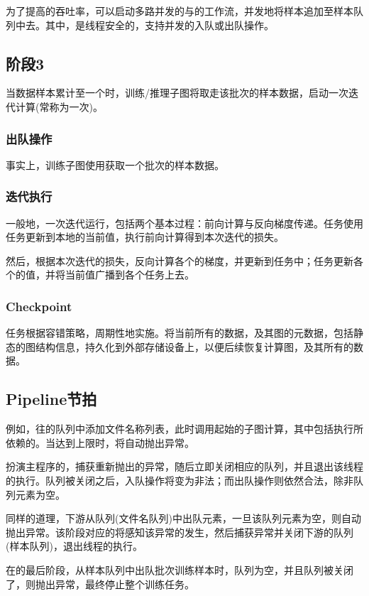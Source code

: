 \begin{content}
为了提高的吞吐率，可以启动多路并发的与的工作流，并发地将样本追加至样本队列中去。其中，是线程安全的，支持并发的入队或出队操作。

\subsection{阶段3}

当数据样本累计至一个时，训练/推理子图将取走该批次的样本数据，启动一次迭代计算(常称为一次)。

\subsubsection{出队操作}

事实上，训练子图使用获取一个批次的样本数据。

\subsubsection{迭代执行}

一般地，一次迭代运行，包括两个基本过程：前向计算与反向梯度传递。任务使用任务更新到本地的当前值，执行前向计算得到本次迭代的损失。

然后，根据本次迭代的损失，反向计算各个的梯度，并更新到任务中；任务更新各个的值，并将当前值广播到各个任务上去。

\subsubsection{Checkpoint}

任务根据容错策略，周期性地实施。将当前所有的数据，及其图的元数据，包括静态的图结构信息，持久化到外部存储设备上，以便后续恢复计算图，及其所有的数据。

\subsection{Pipeline节拍}

例如，往的队列中添加文件名称列表，此时调用起始的子图计算，其中包括执行所依赖的。当达到上限时，将自动抛出异常。

扮演主程序的，捕获重新抛出的异常，随后立即关闭相应的队列，并且退出该线程的执行。队列被关闭之后，入队操作将变为非法；而出队操作则依然合法，除非队列元素为空。

同样的道理，下游从队列(文件名队列)中出队元素，一旦该队列元素为空，则自动抛出异常。该阶段对应的将感知该异常的发生，然后捕获异常并关闭下游的队列(样本队列)，退出线程的执行。

在的最后阶段，从样本队列中出队批次训练样本时，队列为空，并且队列被关闭了，则抛出异常，最终停止整个训练任务。

\end{content}